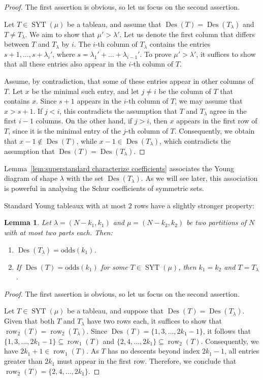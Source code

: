 \documentclass[11pt]{article}
\newtheorem{lemma}[theo]{Lemma}
\theoremstyle{definition}
\numberwithin{equation}{section}
\newcommand{\Des}{\operatorname{Des}}
\newcommand{\Syt}{\operatorname{SYT}}
\newcommand{\row}{\operatorname{row}}
\newcommand{\odds}{\mathrm{odds}}
\begin{document}
\begin{proof}
    The first assertion is obvious, so let us focus on the second assertion.
    
    Let $T \in \Syt(\mu)$ be a tableau, and assume that $\Des(T) = \Des(T_\lambda)$ and $T \ne T_\lambda$. We aim to show that $\mu' > \lambda'$. Let us denote the first column that differs between $T$ and $T_\lambda$ by $i$. The $i$-th column of $T_\lambda$ contains the entries $s+1,\dots,s+\lambda_{i}'$, where $s = \lambda_1' + \dots + \lambda_{i-1}'$. To prove $\mu' > \lambda'$, it suffices to show that all these entries also appear in the $i$-th column of $T$.
    
    Assume, by contradiction, that some of these entries appear in other columns of $T$. Let $x$ be the minimal such entry, and let $j \ne i$ be the column of $T$ that contains $x$. Since $s+1$ appears in the $i$-th column of $T$, we may assume that $x > s+1$. If $j < i$, this contradicts the assumption that $T$ and $T_\lambda$ agree in the first $i-1$ columns. On the other hand, if $j > i$, then $x$ appears in the first row of $T$, since it is the minimal entry of the $j$-th column of $T$. Consequently, we obtain that $x-1 \notin \Des(T)$, while $x-1 \in \Des(T_\lambda)$, which contradicts the assumption that $\Des(T) = \Des(T_\lambda)$.
\end{proof}

Lemma~\ref{lem:superstandard characterize coefficients} associates the Young diagram of shape $\lambda$ with the set $\Des(T_\lambda)$. As we will see later, this association is powerful in analysing the Schur coefficients of symmetric sets.


Standard Young tableaux with at most $2$ rows have a slightly stronger property:
\begin{lemma}
\label{lem:superstandard two rows characterize coefficients}
    Let $\lambda = (N-k_1,k_1)$ and $\mu = (N-k_2,k_2)$ be two partitions of $N$ with at most two parts each. Then:
    \begin{enumerate}
        \item $\Des(T_\lambda) = \odds(k_1)$.
        \item If $\Des(T) = \odds(k_1)$ for some $T \in \Syt(\mu)$, then $k_1 = k_2$ and $T = T_\lambda$.
    \end{enumerate}
\end{lemma}

    

\begin{proof}
    The first assertion is obvious, so let us focus on the second assertion.

    Let $T \in \Syt(\mu)$ be a tableau, and suppose that $\Des(T) = \Des(T_\lambda)$. Given that both $T$ and $T_\lambda$ have two rows each, it suffices to show that $\row_2(T) = \row_2(T_\lambda)$. Since $\Des(T) = \{1,3,\dots,2k_1-1\}$, it follows that $\{1,3,\dots,2k_1-1\} \subseteq \row_1(T)$ and $\{2,4,\dots,2k_1\} \subseteq \row_2(T)$. Consequently, we have $2k_1+1 \in \row_1(T)$. As $T$ has no descents beyond index $2k_1-1$, all entries greater than $2k_1$ must appear in the first row. Therefore, we conclude that $\row_2(T) = \{2,4,\dots,2k_1\}$.
\end{proof}
\end{document}

